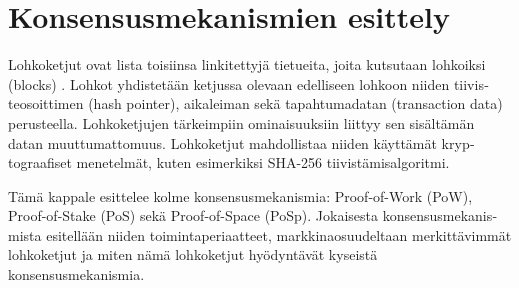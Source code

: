 \chapter{Konsensusmekanismien esittely\label{esittely}}
\begin{otherlanguage}{english}

Lohkoketjut ovat lista toisiinsa linkitettyjä tietueita, joita kutsutaan lohkoiksi (blocks) \cite{blockchain1}. Lohkot yhdistetään ketjussa olevaan edelliseen lohkoon niiden tiivisteosoittimen (hash pointer), aikaleiman sekä tapahtumadatan (transaction data) perusteella. Lohkoketjujen tärkeimpiin ominaisuuksiin liittyy sen sisältämän datan muuttumattomuus. Lohkoketjut mahdollistaa niiden käyttämät kryptograafiset menetelmät, kuten esimerkiksi SHA-256 tiivistämisalgoritmi.

Tämä kappale esittelee kolme konsensusmekanismia: Proof-of-Work (PoW), Proof-of-Stake (PoS) sekä Proof-of-Space (PoSp). Jokaisesta konsensusmekanismista esitellään niiden toimintaperiaatteet, markkinaosuudeltaan merkittävimmät lohkoketjut ja miten nämä lohkoketjut hyödyntävät kyseistä konsensusmekanismia.





\end{otherlanguage}